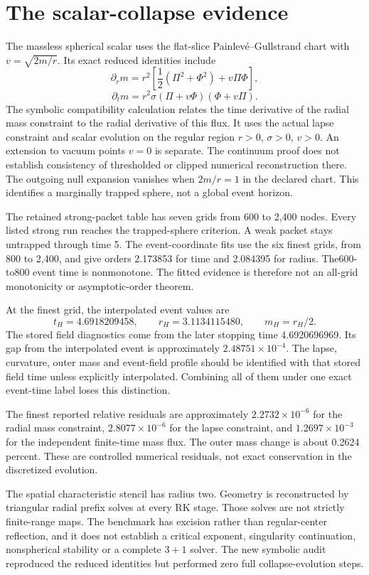 \clearpage
\section{The scalar-collapse evidence}\label{c:verify:scalar}

The massless spherical scalar uses the flat-slice Painlev\'e--Gullstrand chart with \(v=\sqrt{2m/r}\). Its exact reduced identities include
\[
 \partial_rm=r^2\left[\frac12(\Pi^2+\Phi^2)+v\Pi\Phi\right],
\]
\[
 \partial_tm=r^2\sigma(\Pi+v\Phi)(\Phi+v\Pi).
\]
The symbolic compatibility calculation relates the time derivative of the radial mass constraint to the radial derivative of this flux. It uses the actual lapse constraint and scalar evolution on the regular region \(r>0\), \(\sigma>0\), \(v>0\). An extension to vacuum points \(v=0\) is separate. The continuum proof does not establish consistency of thresholded or clipped numerical reconstruction there. The outgoing null expansion vanishes when \(2m/r=1\) in the declared chart. This identifies a marginally trapped sphere, not a global event horizon.

The retained strong-packet table has seven grids from 600 to 2,400 nodes. Every listed strong run reaches the trapped-sphere criterion. A weak packet stays untrapped through time 5. The event-coordinate fits use the six finest grids, from 800 to 2,400, and give orders 2.173853 for time and 2.084395 for radius. The600-to800 event time is nonmonotone. The fitted evidence is therefore not an all-grid monotonicity or asymptotic-order theorem.

At the finest grid, the interpolated event values are
\[
 t_H=4.6918209458,\qquad r_H=3.1134115480,
 \qquad m_H=r_H/2.
\]
The stored field diagnostics come from the later stopping time 4.6920696969. Its gap from the interpolated event is approximately \(2.48751\times10^{-4}\). The lapse, curvature, outer mass and event-field profile should be identified with that stored field time unless explicitly interpolated. Combining all of them under one exact event-time label loses this distinction.

The finest reported relative residuals are approximately \(2.2732\times10^{-6}\) for the radial mass constraint, \(2.8077\times10^{-6}\) for the lapse constraint, and \(1.2697\times10^{-3}\) for the independent finite-time mass flux. The outer mass change is about 0.2624 percent. These are controlled numerical residuals, not exact conservation in the discretized evolution.

The spatial characteristic stencil has radius two. Geometry is reconstructed by triangular radial prefix solves at every RK stage. Those solves are not strictly finite-range maps. The benchmark has excision rather than regular-center reflection, and it does not establish a critical exponent, singularity continuation, nonspherical stability or a complete \(3+1\) solver. The new symbolic audit reproduced the reduced identities but performed zero full collapse-evolution steps.

